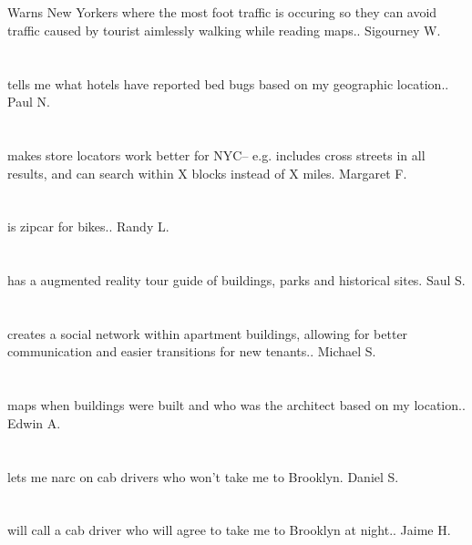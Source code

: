 \section{}Warns New Yorkers where the most foot traffic is occuring so they can avoid traffic caused by tourist aimlessly walking while reading maps.. Sigourney W.
\section{}tells me what hotels have reported bed bugs based on my geographic location.. Paul N.
\section{}makes store locators work better for NYC-- e.g. includes cross streets in all results,  and can search within X blocks instead of X miles. Margaret F.
\section{}is zipcar for bikes.. Randy L.
\section{}has a augmented reality tour guide of buildings,  parks and historical sites.  Saul S.
\section{}creates a social network within apartment buildings,  allowing for better communication and easier transitions for new tenants.. Michael S.
\section{} maps when buildings were built and who was the architect based on my location.. Edwin A.
\section{}lets me narc on cab drivers who won't take me to Brooklyn. Daniel S.
\section{}will call a cab driver who will agree to take me to Brooklyn at night.. Jaime H.

